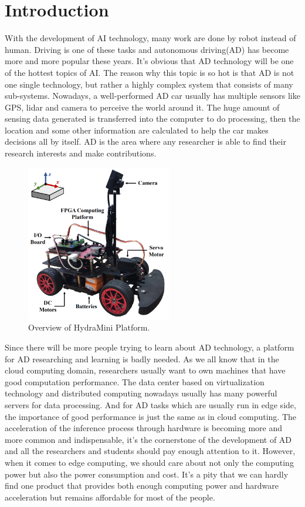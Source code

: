 \section{Introduction}
With the development of AI technology, many work are done by robot instead of human. Driving is one of these tasks and autonomous driving(AD) has become more and more popular these years. It's obvious that AD technology will be one of the hottest topics of AI. The reason why this topic is so hot is that AD is not one single technology, but rather a highly complex system that consists of many sub-systems\cite{liu2017creating}. Nowadays, a well-performed AD car usually has multiple sensors like GPS, lidar and camera to perceive the world around it. The huge amount of sensing data generated is transferred into the computer to do processing, then the location and some other information are calculated to help the car makes decisions all by itself. AD is the area where any researcher is able to find their research interests and make contributions.

\begin{figure}[t]
    \centering
    \includegraphics[width=2.5in]{hydramini}
    \caption{Overview of HydraMini Platform.}
    \label{fig:hydramini}
\end{figure}

Since there will be more people trying to learn about AD technology, a platform for AD researching and learning is badly needed. As we all know that in the cloud computing domain, researchers usually want to own machines that have good computation performance. The data center based on virtualization technology\cite{nurmi2009eucalyptus} and distributed computing\cite{dean2008mapreduce} nowadays usually has many powerful servers for data processing. And for AD tasks which are usually run in edge side, the importance of good performance is just the same as in cloud computing. The acceleration of the inference process through hardware is becoming more and more common and indispensable, it's the cornerstone of the development of AD and all the researchers and students should pay enough attention to it. However, when it comes to edge computing\cite{shi2016edge}, we should care about not only the computing power but also the power consumption and cost. It's a pity that we can hardly find one product that provides both enough computing power and hardware acceleration but remains affordable for most of the people.

